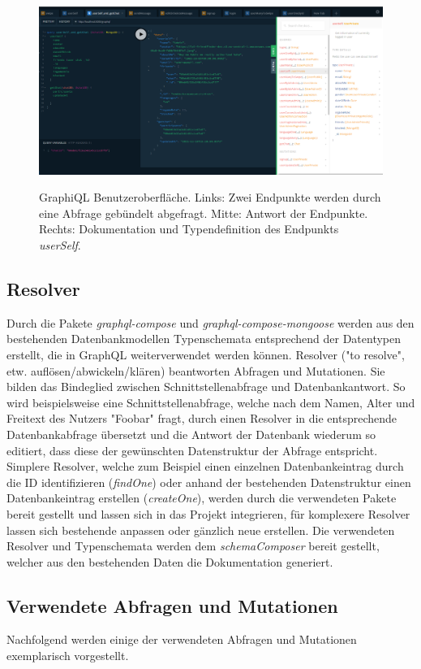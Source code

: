 \begin{figure}
	\centering
    \includegraphics[width=\textwidth]{sources/graphiql.png}\cite{}
	\caption{GraphiQL Benutzeroberfläche. Links: Zwei Endpunkte werden durch eine Abfrage gebündelt abgefragt. Mitte: Antwort der Endpunkte. Rechts: Dokumentation und Typendefinition des Endpunkts \textit{userSelf}.}
	\label{figGQL1}
\end{figure}

\subsection{Resolver}
Durch die Pakete \textit{graphql-compose} und \textit{graphql-compose-mongoose} werden aus den bestehenden Datenbankmodellen Typenschemata entsprechend der Datentypen erstellt, die in GraphQL weiterverwendet werden können. 
Resolver ("to resolve", etw. auflösen/abwickeln/klären) beantworten Abfragen und Mutationen. Sie bilden das Bindeglied zwischen Schnittstellenabfrage und Datenbankantwort. So wird beispielsweise eine Schnittstellenabfrage, welche nach dem Namen, Alter und Freitext des Nutzers "Foobar" fragt, durch einen Resolver in die entsprechende Datenbankabfrage übersetzt und die Antwort der Datenbank wiederum so editiert, dass diese der gewünschten Datenstruktur der Abfrage entspricht. Simplere Resolver, welche zum Beispiel einen einzelnen Datenbankeintrag durch die ID identifizieren (\textit{findOne}) oder anhand der bestehenden Datenstruktur einen Datenbankeintrag erstellen (\textit{createOne}), werden durch die verwendeten Pakete bereit gestellt und lassen sich in das Projekt integrieren, für komplexere Resolver lassen sich bestehende anpassen oder gänzlich neue erstellen.
Die verwendeten Resolver und Typenschemata werden dem \textit{schemaComposer} bereit gestellt, welcher aus den bestehenden Daten die Dokumentation generiert.


\subsection{Verwendete Abfragen und Mutationen}
Nachfolgend werden einige der verwendeten Abfragen und Mutationen exemplarisch vorgestellt.

